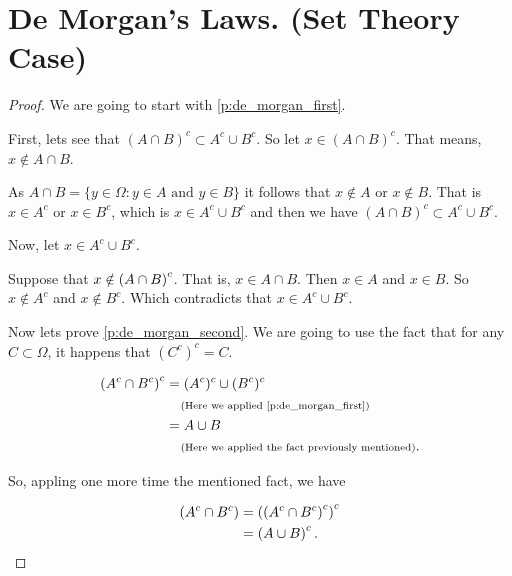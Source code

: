 ﻿\chapter{De Morgan's Laws. (Set Theory Case)}
    
    \begin{proof}
        We are going to start with \eqref{p:de_morgan_first}.\pn
        
        First, lets see that $(A \cap B)^c \subset  A^c \cup B^c$. So let $x \in (A \cap B)^c$. That means,
        $x \notin A \cap B$.\pn
        
        As $A \cap  B = \{ y \in \Omega : y \in A \text{ and } y \in B \}$ it follows that
        $x \notin A$ or $x \notin B$. That is $x \in A^c$ or $x \in B^c$, which is $x \in A^c \cup B^c$ and then
        we have $(A \cap B)^c \subset  A^c \cup B^c$.\pn
        
        Now, let $x \in A^c \cup B^c$.\pn 
        
        Suppose that $x \notin \left(A \cap B\right)^c$. That is, $x \in A \cap B$. Then $x \in A$ and $x \in B$. So
        $x \notin A^c$ and $x \notin B^c$. Which contradicts that $x \in A^c \cup B^c$.\pn
        
        Now lets prove \eqref{p:de_morgan_second}. We are going to use the fact that for any $C \subset \Omega$,
        it happens that $(C^c)^c = C$.\pn
        
        \begin{align}
            \left(A^c \cap B^c\right)^c  &=  (A^c)^c \cup (B^c)^c                                    \\
                                    &\;\;\;\;\mbox{{\scriptsize(Here we applied \eqref{p:de_morgan_first})}}        \\
                                    &=  A \cup B                                                \\
                                    &\;\;\;\;\mbox{{\scriptsize(Here we applied the fact previously mentioned)}}.   \\
        \end{align}\pn
        
        So, appling one more time the mentioned fact, we have
        
        \begin{align}
            \left(A^c \cap B^c\right)    &=  \left(\left(A^c \cap B^c\right)^c\right)^c        \\
                                    &=  \left(A \cup B\right)^c. \;\;\;\;\qedhere
        \end{align}
        
    \end{proof}